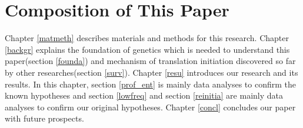 
\section{Composition of This Paper}

Chapter \ref{matmeth} describes materials and methods for this research.
Chapter \ref{backgr} explains the foundation of genetics which is
needed to understand this paper(section \ref{founda}) and mechanism of
translation initiation discovered so far by other researches(section
\ref{surv}).  
Chapter \ref{resu} introduces our research and its results. 
In this chapter, section \ref{prof_ent} is mainly data analyses to
confirm the known 
hypotheses and section \ref{lowfreq} and section \ref{reinitia} are
mainly data analyses to confirm our original hypotheses.
Chapter \ref{concl} concludes our paper with future prospects.


